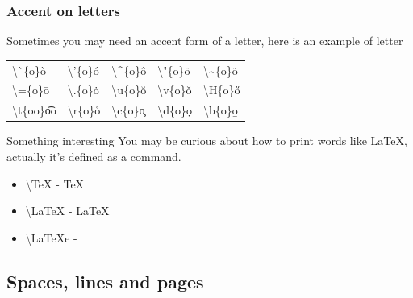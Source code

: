 \documentclass{beamer}
\newcommand{\samplecommand}[1]{\alert{\textbackslash #1}}
\newcommand{\sampleaccent}[3]{\samplecommand{#1}\{#3\}\quad #2{#3}}
\begin{document}
\begin{frame}
	\frametitle{Accent on letters}
	Sometimes you may need an accent form of a letter, here is an example of letter 
	\begin{center}
	\begin{tabular}{lllll}
		\sampleaccent{\`{}}{\`}{o} & \sampleaccent{'}{\'}{o} & \sampleaccent{\^{}}{\^}{o} & \sampleaccent{"}{\"}{o} & \sampleaccent{\~{}}{\~}{o} \\
		\sampleaccent{=}{\=}{o} & \sampleaccent{.}{\.}{o} & \sampleaccent{u}{\u}{o} & \sampleaccent{v}{\v}{o} & \sampleaccent{H}{\H}{o}\\
		\sampleaccent{t}{\t}{oo} & \sampleaccent{r}{\r}{o} & \sampleaccent{c}{\c}{o} & \sampleaccent{d}{\d}{o} & \sampleaccent{b}{\b}{o}
	\end{tabular}
	\end{center}
	\begin{block}{Something interesting}
		You may be curious about how to print words like \LaTeX, actually it's defined as a command.
		\begin{itemize}
			\item \samplecommand{TeX} - \TeX
			\item \samplecommand{LaTeX} - \LaTeX
			\item \samplecommand{LaTeXe} - \LaTeXe
		\end{itemize}
	\end{block}
\end{frame}

\subsection{Spaces, lines and pages}
\end{document}
